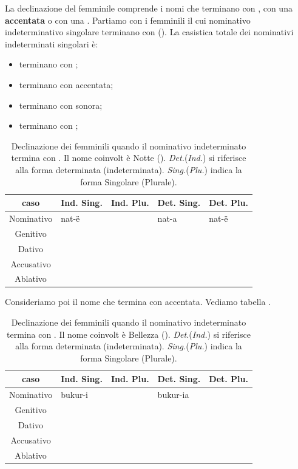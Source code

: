 La declinazione del femminile comprende i nomi che terminano con , con una  \textbf{accentata} o con una . Partiamo con i femminili il cui nominativo indeterminativo singolare terminano con  (). La casistica totale dei nominativi indeterminati singolari è:

\begin{itemize}
    \item terminano con ;
    \item terminano con  accentata;
    \item terminano con  sonora;
    \item terminano con ;
\end{itemize}

\begin{table}[H]
    \centering
    \begin{tabular}{cllll}
        \toprule
        caso        & Ind. Sing.    & Ind. Plu. & Det. Sing.    & Det. Plu. \\
        \midrule
        Nominativo  & nat-ë         &           & nat-a         & nat-ë  \\
        Genitivo    & & & & \\
        Dativo      & & & & \\
        Accusativo  & & & & \\
        Ablativo    & & & & \\
        \bottomrule
    \end{tabular}
    \caption{Declinazione dei femminili quando il nominativo indeterminato termina con . Il nome coinvolt è Notte (). \textit{Det.}(\textit{Ind.}) si riferisce alla forma determinata (indeterminata). \textit{Sing.}(\textit{Plu.}) indica la forma Singolare (Plurale).}
    \label{tbl:terminacone}
\end{table}

Consideriamo poi il nome che termina con  accentata. Vediamo tabella .

\begin{table}[H]
    \centering
    \begin{tabular}{cllll}
        \toprule
        caso        & Ind. Sing.    & Ind. Plu. & Det. Sing.    & Det. Plu. \\
        \midrule
        Nominativo  & bukur-i       &       & bukur-ia               &  \\
        Genitivo    & & & & \\
        Dativo      & & & & \\
        Accusativo  & & & & \\
        Ablativo    & & & & \\
        \bottomrule
    \end{tabular}
    \caption{Declinazione dei femminili quando il nominativo indeterminato termina con . Il nome coinvolt è Bellezza (). \textit{Det.}(\textit{Ind.}) si riferisce alla forma determinata (indeterminata). \textit{Sing.}(\textit{Plu.}) indica la forma Singolare (Plurale).}
    \label{tbl:terminaconi}
\end{table}

